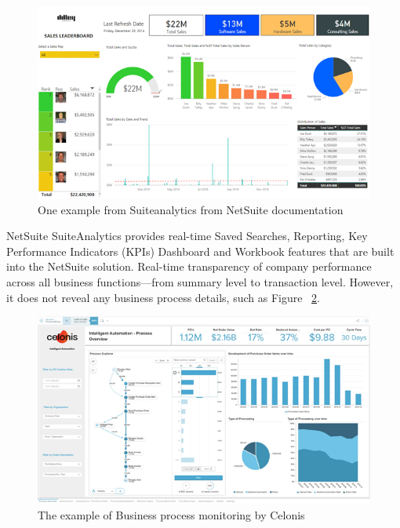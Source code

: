\begin{figure}[!htb]
    \centering 
    \includegraphics[scale=0.7]{resource/Suiteanalytics.png}
    \caption{One example from Suiteanalytics from NetSuite documentation}
    \label{figure:suiteAnalytics}
\end{figure}


NetSuite SuiteAnalytics provides real-time Saved Searches, Reporting, Key Performance Indicators (KPIs) Dashboard and Workbook features that are built into the NetSuite solution. Real-time transparency of company performance across all business functions—from summary level to transaction level. However, it does not reveal any business process details, such as Figure ~\ref{figure:monitor}.


\begin{figure}[!htb]
    \centering 
    \includegraphics[scale=0.7]{resource/monitor.png}
    \caption{The example of Business process monitoring by Celonis}
    \label{figure:monitor}
\end{figure}








